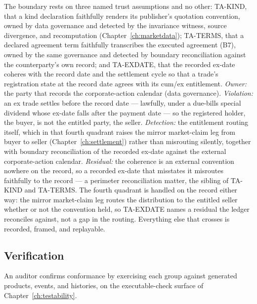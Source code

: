The boundary rests on three named trust assumptions and no other: TA-KIND, that a kind
declaration faithfully renders its publisher's quotation convention, owned by data
governance and detected by the invariance witness, source divergence, and recomputation
(Chapter~\ref{ch:marketdata}); TA-TERMS, that a declared agreement term faithfully
transcribes the executed agreement (B7), owned by the same governance and detected by
boundary reconciliation against the counterparty's own record; and TA-EXDATE, that the
recorded ex-date coheres with the record date and the settlement cycle so that a trade's
registration state at the record date agrees with its cum/ex entitlement. \emph{Owner:}
the party that records the corporate-action calendar (data governance). \emph{Violation:}
an ex trade settles before the record date --- lawfully, under a due-bills special dividend
whose ex-date falls after the payment date --- so the registered holder, the buyer, is not
the entitled party, the seller. \emph{Detection:} the entitlement routing itself, which in
that fourth quadrant raises the mirror market-claim leg from buyer to seller
(Chapter~\ref{ch:settlement}) rather than misrouting silently, together with boundary
reconciliation of the recorded ex-date against the external corporate-action calendar.
\emph{Residual:} the coherence is an external convention nowhere on the record, so a
recorded ex-date that misstates it misroutes faithfully to the record --- a perimeter
reconciliation matter, the sibling of TA-KIND and TA-TERMS. The fourth quadrant is handled
on the record either way: the mirror market-claim leg routes the distribution to the
entitled seller whether or not the convention held, so TA-EXDATE names a residual the
ledger reconciles against, not a gap in the routing. Everything else that crosses is
recorded, framed, and replayable.

\subsection{Verification}

An auditor confirms conformance by exercising each group against generated products,
events, and histories, on the executable-check surface of Chapter~\ref{ch:testability}.

